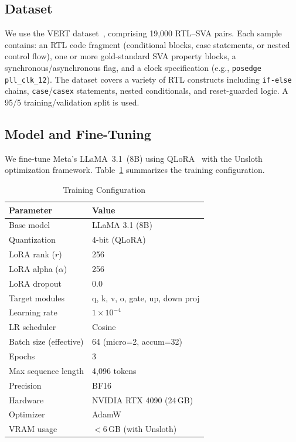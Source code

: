 \documentclass[conference]{IEEEtran}
\begin{document}
\subsection{Dataset}
We use the VERT dataset~\cite{vert}, comprising 19{,}000 RTL--SVA pairs. Each sample contains: an RTL code fragment (conditional blocks, case statements, or nested control flow), one or more gold-standard SVA property blocks, a synchronous/asynchronous flag, and a clock specification (e.g., \texttt{posedge pll\_clk\_12}). The dataset covers a variety of RTL constructs including \texttt{if-else} chains, \texttt{case}/\texttt{casex} statements, nested conditionals, and reset-guarded logic. A 95/5 training/validation split is used.

\subsection{Model and Fine-Tuning}
We fine-tune Meta's LLaMA~3.1~(8B) using QLoRA~\cite{qlora} with the Unsloth~\cite{unsloth} optimization framework. Table~\ref{tab:training} summarizes the training configuration.

\begin{table}[t]
\centering
\caption{Training Configuration}
\label{tab:training}
\begin{tabular}{@{}ll@{}}
\toprule
\textbf{Parameter} & \textbf{Value} \\
\midrule
Base model & LLaMA 3.1 (8B) \\
Quantization & 4-bit (QLoRA) \\
LoRA rank ($r$) & 256 \\
LoRA alpha ($\alpha$) & 256 \\
LoRA dropout & 0.0 \\
Target modules & q, k, v, o, gate, up, down proj \\
Learning rate & $1 \times 10^{-4}$ \\
LR scheduler & Cosine \\
Batch size (effective) & 64 (micro=2, accum=32) \\
Epochs & 3 \\
Max sequence length & 4{,}096 tokens \\
Precision & BF16 \\
Hardware & NVIDIA RTX 4090 (24\,GB) \\
Optimizer & AdamW \\
VRAM usage & $<$6\,GB (with Unsloth) \\
\bottomrule
\end{tabular}
\end{table}
\end{document}
